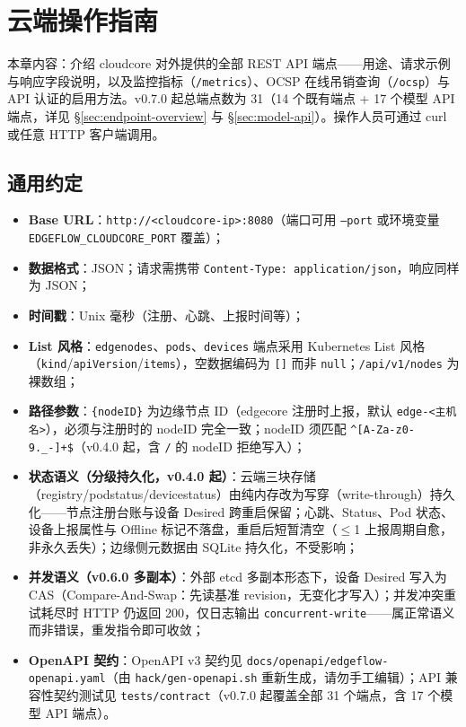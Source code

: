 \chapter{云端操作指南}
\label{ch:4}

本章内容：介绍 cloudcore 对外提供的全部 REST API 端点——用途、请求示例与响应字段说明，以及监控指标（\texttt{/metrics}）、OCSP 在线吊销查询（\texttt{/ocsp}）与 API 认证的启用方法。v0.7.0 起总端点数为 31（14 个既有端点 + 17 个模型 API 端点，详见 \S\ref{sec:endpoint-overview} 与 \S\ref{sec:model-api}）。操作人员可通过 curl 或任意 HTTP 客户端调用。

\section{通用约定}

\begin{itemize}
  \item \textbf{Base URL}：\texttt{http://<cloudcore-ip>:8080}（端口可用 \texttt{--port} 或环境变量 \texttt{EDGEFLOW\_CLOUDCORE\_PORT} 覆盖）；
  \item \textbf{数据格式}：JSON；请求需携带 \texttt{Content-Type: application/json}，响应同样为 JSON；
  \item \textbf{时间戳}：Unix 毫秒（注册、心跳、上报时间等）；
  \item \textbf{List 风格}：\texttt{edgenodes}、\texttt{pods}、\texttt{devices} 端点采用 Kubernetes List 风格（\texttt{kind}/\texttt{apiVersion}/\texttt{items}），空数据编码为 \texttt{[]} 而非 \texttt{null}；\texttt{/api/v1/nodes} 为裸数组；
  \item \textbf{路径参数}：\texttt{\{nodeID\}} 为边缘节点 ID（edgecore 注册时上报，默认 \texttt{edge-<主机名>}），必须与注册时的 nodeID 完全一致；nodeID 须匹配 \verb|^[A-Za-z0-9._-]+$|（v0.4.0 起，含 \texttt{/} 的 nodeID 拒绝写入）；
  \item \textbf{状态语义（分级持久化，v0.4.0 起）}：云端三块存储（registry/podstatus/devicestatus）由纯内存改为写穿（write-through）持久化——节点注册台账与设备 Desired 跨重启保留；心跳、Status、Pod 状态、设备上报属性与 Offline 标记不落盘，重启后短暂清空（$\leq$1 上报周期自愈，非永久丢失）；边缘侧元数据由 SQLite 持久化，不受影响；
  \item \textbf{并发语义（v0.6.0 多副本）}：外部 etcd 多副本形态下，设备 Desired 写入为 CAS（Compare-And-Swap：先读基准 revision，无变化才写入）；并发冲突重试耗尽时 HTTP 仍返回 200，仅日志输出 \texttt{concurrent-write}——属正常语义而非错误，重发指令即可收敛；
  \item \textbf{OpenAPI 契约}：OpenAPI v3 契约见 \texttt{docs/openapi/edgeflow-openapi.yaml}（由 \texttt{hack/gen-openapi.sh} 重新生成，请勿手工编辑）；API 兼容性契约测试见 \texttt{tests/contract}（v0.7.0 起覆盖全部 31 个端点，含 17 个模型 API 端点）。
\end{itemize}

